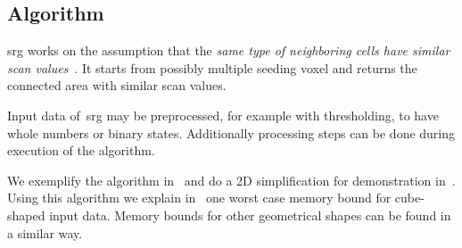 \documentclass{article}
\begin{document}
\subsection{Algorithm}\label{subsec:algo}
\acresetall
\Ac{srg} works on the assumption that the \textit{same type of neighboring cells have similar scan values}~\cite{1994adams}.
It starts from possibly multiple seeding voxel and returns the connected area with similar scan values.\par
Input data of~\ac{srg} may be preprocessed, for example with thresholding, to have whole numbers or binary states.
Additionally processing steps can be done during execution of the algorithm.\par
We exemplify the algorithm in~ and do a 2D simplification for demonstration in~.
Using this algorithm we explain in~ one worst case memory bound for cube-shaped input data.
Memory bounds for other geometrical shapes can be found in a similar way.
\end{document}
